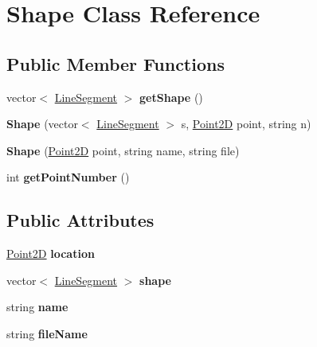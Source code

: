 \hypertarget{class_shape}{
\section{Shape Class Reference}
\label{class_shape}
}
\subsection*{Public Member Functions}
\begin{DoxyCompactItemize}
\item 
\hypertarget{class_shape_a3b8f9a882e53fcf1852109b30fa5b75a}{
vector$<$ \hyperlink{class_line_segment}{LineSegment} $>$ {\bfseries getShape} ()}
\label{class_shape_a3b8f9a882e53fcf1852109b30fa5b75a}

\item 
\hypertarget{class_shape_a8a725902cfbe4e9dc82a1a07595ea253}{
{\bfseries Shape} (vector$<$ \hyperlink{class_line_segment}{LineSegment} $>$ s, \hyperlink{class_point2_d}{Point2D} point, string n)}
\label{class_shape_a8a725902cfbe4e9dc82a1a07595ea253}

\item 
\hypertarget{class_shape_a5dfa6164561614acd68f9dae2b2cbdf9}{
{\bfseries Shape} (\hyperlink{class_point2_d}{Point2D} point, string name, string file)}
\label{class_shape_a5dfa6164561614acd68f9dae2b2cbdf9}

\item 
\hypertarget{class_shape_a41b5e1410049bc5f4abbe1bc9df03663}{
int {\bfseries getPointNumber} ()}
\label{class_shape_a41b5e1410049bc5f4abbe1bc9df03663}

\end{DoxyCompactItemize}
\subsection*{Public Attributes}
\begin{DoxyCompactItemize}
\item 
\hypertarget{class_shape_a6adf5b999171efe7d1d122e557067106}{
\hyperlink{class_point2_d}{Point2D} {\bfseries location}}
\label{class_shape_a6adf5b999171efe7d1d122e557067106}

\item 
\hypertarget{class_shape_a05b6e95f16abf76ad3d5ae05c8ccb3c7}{
vector$<$ \hyperlink{class_line_segment}{LineSegment} $>$ {\bfseries shape}}
\label{class_shape_a05b6e95f16abf76ad3d5ae05c8ccb3c7}

\item 
\hypertarget{class_shape_afef5e9426226fd7af49fe48ec16b97f3}{
string {\bfseries name}}
\label{class_shape_afef5e9426226fd7af49fe48ec16b97f3}

\item 
\hypertarget{class_shape_a0c594b8c4dbb8c3600f9ac1f6b6a1b4a}{
string {\bfseries fileName}}
\label{class_shape_a0c594b8c4dbb8c3600f9ac1f6b6a1b4a}

\end{DoxyCompactItemize}


